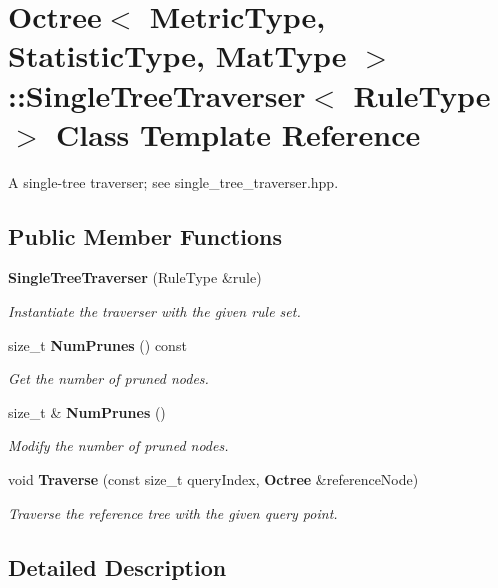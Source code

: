 \section{Octree$<$ Metric\+Type, Statistic\+Type, Mat\+Type $>$\+:\+:Single\+Tree\+Traverser$<$ Rule\+Type $>$ Class Template Reference}
\label{classmlpack_1_1tree_1_1Octree_1_1SingleTreeTraverser}


A single-\/tree traverser; see single\+\_\+tree\+\_\+traverser.\+hpp.  


\subsection*{Public Member Functions}
\begin{DoxyCompactItemize}
\item 
\textbf{ Single\+Tree\+Traverser} (Rule\+Type \&rule)
\begin{DoxyCompactList}\small\item\em Instantiate the traverser with the given rule set. \end{DoxyCompactList}\item 
size\+\_\+t \textbf{ Num\+Prunes} () const
\begin{DoxyCompactList}\small\item\em Get the number of pruned nodes. \end{DoxyCompactList}\item 
size\+\_\+t \& \textbf{ Num\+Prunes} ()
\begin{DoxyCompactList}\small\item\em Modify the number of pruned nodes. \end{DoxyCompactList}\item 
void \textbf{ Traverse} (const size\+\_\+t query\+Index, \textbf{ Octree} \&reference\+Node)
\begin{DoxyCompactList}\small\item\em Traverse the reference tree with the given query point. \end{DoxyCompactList}\end{DoxyCompactItemize}


\subsection{Detailed Description}
